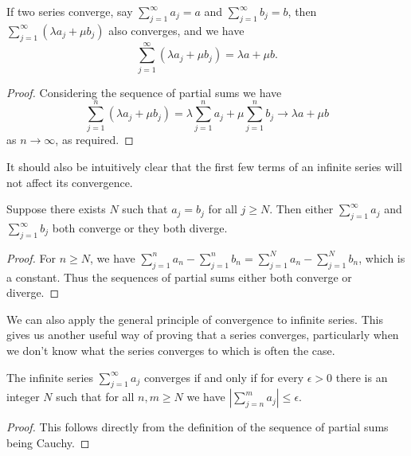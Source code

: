\documentclass[a4paper]{scrartcl}
\begin{document}
\begin{proposition}
	If two series converge, say $\sum_{j = 1}^{\infty} a_j = a$ and $\sum_{j = 1}^{\infty} b_j = b$, then $\sum_{j = 1}^{\infty} (\lambda a_j + \mu b_j)$ also converges, and we have
	$$
	\sum_{j = 1}^{\infty} (\lambda a_j + \mu b_j) = \lambda a + \mu b.
	$$
\end{proposition}
\begin{proof}
	Considering the sequence of partial sums we have
	$$
	\sum_{j = 1}^n (\lambda a_j + \mu b_j) = \lambda \sum_{j=1}^n a_j + \mu \sum_{j = 1}^n b_j \longrightarrow \lambda a + \mu b
	$$
	as $n \rightarrow \infty$, as required.
\end{proof}

It should also be intuitively clear that the first few terms of an infinite series will not affect its convergence.

\begin{proposition}
Suppose there exists $N$ such that $a_j = b_j$ for all $j \geq N$. Then either $\sum_{j = 1}^{\infty} a_j$ and $\sum_{j = 1}^{\infty} b_j$ both converge or they both diverge.
\end{proposition}
\begin{proof}
	For $n \geq N$, we have $\sum_{j = 1}^n a_n - \sum_{j = 1}^n b_n =  \sum_{j = 1}^N a_n - \sum_{j = 1}^N b_n$, which is a constant. Thus the sequences of partial sums either both converge or diverge.
\end{proof}

We can also apply the general principle of convergence to infinite series. This gives us another useful way of proving that a series converges, particularly when we don't know what the series converges to which is often the case.

\begin{theorem}
	The infinite series $\sum_{j = 1}^{\infty} a_j$ converges if and only if for every $\epsilon > 0$ there is an integer $N$ such that for all $n, m \geq N$ we have $|\sum_{j = n}^m a_j| \leq \epsilon$.
\end{theorem}
\begin{proof}
	This follows directly from the definition of the sequence of partial sums being Cauchy.
\end{proof}


\end{document}
